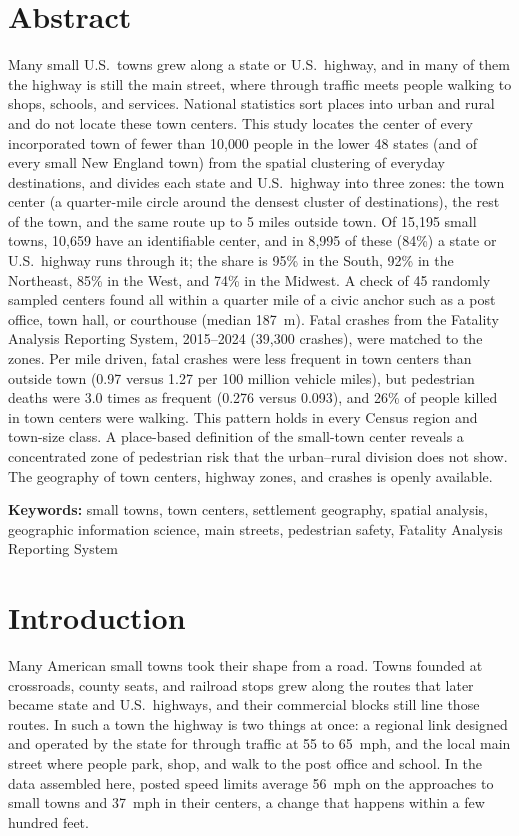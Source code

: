 \documentclass[11pt,letterpaper]{article}
\begin{document}
\section*{Abstract}
Many small U.S.\ towns grew along a state or U.S.\ highway, and in many of them the highway is still the main street, where through traffic meets people walking to shops, schools, and services. National statistics sort places into urban and rural and do not locate these town centers. This study locates the center of every incorporated town of fewer than 10{,}000 people in the lower 48 states (and of every small New England town) from the spatial clustering of everyday destinations, and divides each state and U.S.\ highway into three zones: the town center (a quarter-mile circle around the densest cluster of destinations), the rest of the town, and the same route up to 5 miles outside town. Of 15{,}195 small towns, 10{,}659 have an identifiable center, and in 8{,}995 of these (84\%) a state or U.S.\ highway runs through it; the share is 95\% in the South, 92\% in the Northeast, 85\% in the West, and 74\% in the Midwest. A check of 45 randomly sampled centers found all within a quarter mile of a civic anchor such as a post office, town hall, or courthouse (median 187~m). Fatal crashes from the Fatality Analysis Reporting System, 2015--2024 (39{,}300 crashes), were matched to the zones. Per mile driven, fatal crashes were less frequent in town centers than outside town (0.97 versus 1.27 per 100 million vehicle miles), but pedestrian deaths were 3.0 times as frequent (0.276 versus 0.093), and 26\% of people killed in town centers were walking. This pattern holds in every Census region and town-size class. A place-based definition of the small-town center reveals a concentrated zone of pedestrian risk that the urban--rural division does not show. The geography of town centers, highway zones, and crashes is openly available.

\textbf{Keywords:} small towns, town centers, settlement geography, spatial analysis, geographic information science, main streets, pedestrian safety, Fatality Analysis Reporting System

\section{Introduction}
Many American small towns took their shape from a road. Towns founded at crossroads, county seats, and railroad stops grew along the routes that later became state and U.S.\ highways, and their commercial blocks still line those routes. In such a town the highway is two things at once: a regional link designed and operated by the state for through traffic at 55 to 65~mph, and the local main street where people park, shop, and walk to the post office and school. In the data assembled here, posted speed limits average 56~mph on the approaches to small towns and 37~mph in their centers, a change that happens within a few hundred feet.
\end{document}
